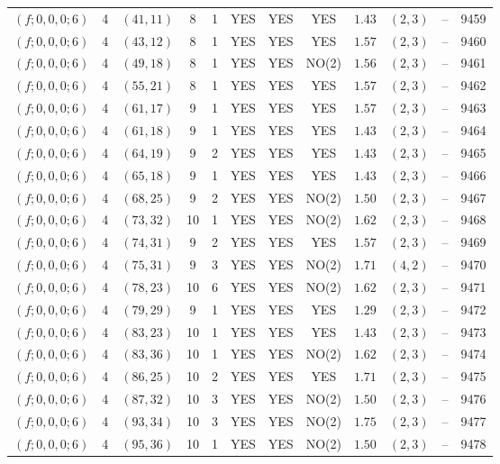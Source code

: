 \begin{longtable}{|c|c|c|c|c|c|c|c|c|c|c|c|}
$(f;0,0,0;6)$ & 4 & $(41,11)$ & 8 & 1 & YES & YES & YES & $1.43$ & $(2,3)$ & -- & 9459\\
$(f;0,0,0;6)$ & 4 & $(43,12)$ & 8 & 1 & YES & YES & YES & $1.57$ & $(2,3)$ & -- & 9460\\
$(f;0,0,0;6)$ & 4 & $(49,18)$ & 8 & 1 & YES & YES & NO(2) & $1.56$ & $(2,3)$ & -- & 9461\\
$(f;0,0,0;6)$ & 4 & $(55,21)$ & 8 & 1 & YES & YES & YES & $1.57$ & $(2,3)$ & -- & 9462\\
$(f;0,0,0;6)$ & 4 & $(61,17)$ & 9 & 1 & YES & YES & YES & $1.57$ & $(2,3)$ & -- & 9463\\
$(f;0,0,0;6)$ & 4 & $(61,18)$ & 9 & 1 & YES & YES & YES & $1.43$ & $(2,3)$ & -- & 9464\\
$(f;0,0,0;6)$ & 4 & $(64,19)$ & 9 & 2 & YES & YES & YES & $1.43$ & $(2,3)$ & -- & 9465\\
$(f;0,0,0;6)$ & 4 & $(65,18)$ & 9 & 1 & YES & YES & YES & $1.43$ & $(2,3)$ & -- & 9466\\
$(f;0,0,0;6)$ & 4 & $(68,25)$ & 9 & 2 & YES & YES & NO(2) & $1.50$ & $(2,3)$ & -- & 9467\\
$(f;0,0,0;6)$ & 4 & $(73,32)$ & 10 & 1 & YES & YES & NO(2) & $1.62$ & $(2,3)$ & -- & 9468\\
$(f;0,0,0;6)$ & 4 & $(74,31)$ & 9 & 2 & YES & YES & YES & $1.57$ & $(2,3)$ & -- & 9469\\
$(f;0,0,0;6)$ & 4 & $(75,31)$ & 9 & 3 & YES & YES & NO(2) & $1.71$ & $(4,2)$ & -- & 9470\\
$(f;0,0,0;6)$ & 4 & $(78,23)$ & 10 & 6 & YES & YES & NO(2) & $1.62$ & $(2,3)$ & -- & 9471\\
$(f;0,0,0;6)$ & 4 & $(79,29)$ & 9 & 1 & YES & YES & YES & $1.29$ & $(2,3)$ & -- & 9472\\
$(f;0,0,0;6)$ & 4 & $(83,23)$ & 10 & 1 & YES & YES & YES & $1.43$ & $(2,3)$ & -- & 9473\\
$(f;0,0,0;6)$ & 4 & $(83,36)$ & 10 & 1 & YES & YES & NO(2) & $1.62$ & $(2,3)$ & -- & 9474\\
$(f;0,0,0;6)$ & 4 & $(86,25)$ & 10 & 2 & YES & YES & YES & $1.71$ & $(2,3)$ & -- & 9475\\
$(f;0,0,0;6)$ & 4 & $(87,32)$ & 10 & 3 & YES & YES & NO(2) & $1.50$ & $(2,3)$ & -- & 9476\\
$(f;0,0,0;6)$ & 4 & $(93,34)$ & 10 & 3 & YES & YES & NO(2) & $1.75$ & $(2,3)$ & -- & 9477\\
$(f;0,0,0;6)$ & 4 & $(95,36)$ & 10 & 1 & YES & YES & NO(2) & $1.50$ & $(2,3)$ & -- & 9478\\

\end{longtable}
